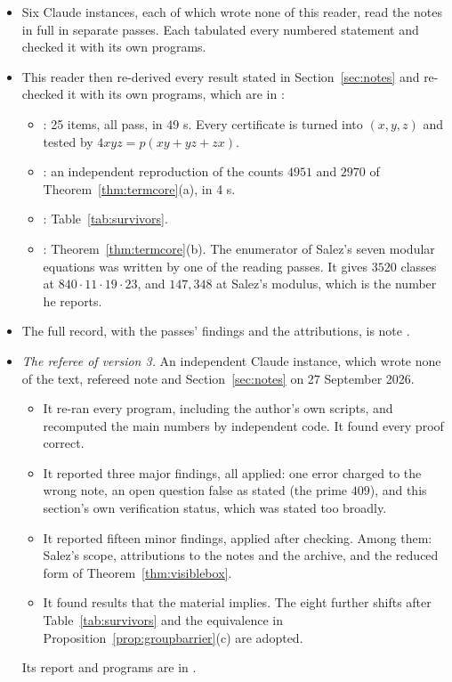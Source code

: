 \begin{itemize}
\item Six Claude instances, each of which wrote none of this reader, read the notes in full in separate passes. Each tabulated every numbered statement and checked it with its own programs.
\item This reader then re-derived every result stated in Section~\ref{sec:notes} and re-checked it with its own programs, which are in :
\begin{itemize}
\item {}: 25 items, all pass, in 49 s. Every certificate is turned into $(x,y,z)$ and tested by $4xyz=p(xy+yz+zx)$.
\item {}: an independent reproduction of the counts $4951$ and $2970$ of Theorem~\ref{thm:termcore}(a), in 4 s.
\item {}: Table~\ref{tab:survivors}.
\item {}: Theorem~\ref{thm:termcore}(b). The enumerator of Salez's seven modular equations was written by one of the reading passes. It gives $3520$ classes at $840\cdot11\cdot19\cdot23$, and $147{,}348$ at Salez's modulus, which is the number he reports.
\end{itemize}
\item The full record, with the passes' findings and the attributions, is note .
\item \emph{The referee of version 3.} An independent Claude instance, which wrote none of the text, refereed note  and Section~\ref{sec:notes} on 27 September 2026.
\begin{itemize}
\item It re-ran every program, including the author's own scripts, and recomputed the main numbers by independent code. It found every proof correct.
\item It reported three major findings, all applied: one error charged to the wrong note, an open question false as stated (the prime $409$), and this section's own verification status, which was stated too broadly.
\item It reported fifteen minor findings, applied after checking. Among them: Salez's scope, attributions to the notes and the archive, and the reduced form of Theorem~\ref{thm:visiblebox}.
\item It found results that the material implies. The eight further shifts after Table~\ref{tab:survivors} and the equivalence in Proposition~\ref{prop:groupbarrier}(c) are adopted.
\end{itemize}
Its report and programs are in .
\end{itemize}

